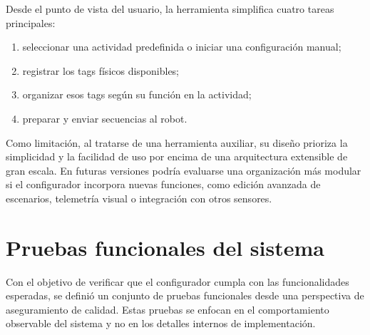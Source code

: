 \documentclass{prgrado}
\begin{document}
Desde el punto de vista del usuario, la herramienta simplifica cuatro tareas principales:

\begin{enumerate}
    \item seleccionar una actividad predefinida o iniciar una configuración manual;
    \item registrar los tags físicos disponibles;
    \item organizar esos tags según su función en la actividad;
    \item preparar y enviar secuencias al robot.
\end{enumerate}

Como limitación, al tratarse de una herramienta auxiliar, su diseño prioriza la simplicidad y la facilidad de uso por encima de una arquitectura extensible de gran escala. En futuras versiones podría evaluarse una organización más modular si el configurador incorpora nuevas funciones, como edición avanzada de escenarios, telemetría visual o integración con otros sensores.

\section{Pruebas funcionales del sistema}

Con el objetivo de verificar que el configurador cumpla con las funcionalidades esperadas, se definió un conjunto de pruebas funcionales desde una perspectiva de aseguramiento de calidad. Estas pruebas se enfocan en el comportamiento observable del sistema y no en los detalles internos de implementación.

\renewcommand{\arraystretch}{1.25}
\end{document}
